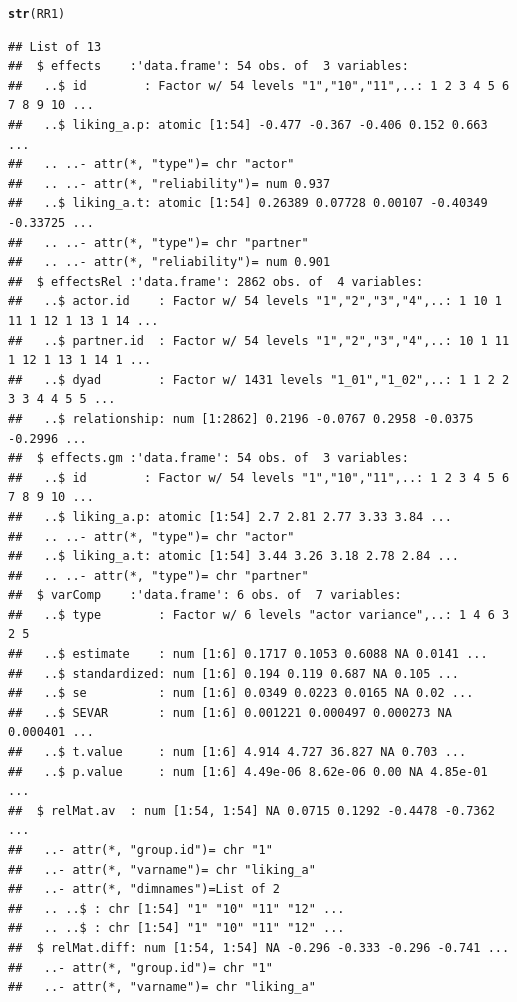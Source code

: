 \documentclass[a4paper]{article}\usepackage[]{graphicx}\usepackage[]{color}
\makeatletter
\newcommand{\hlstd}[1]{\textcolor[rgb]{0.345,0.345,0.345}{#1}}%
\newcommand{\hlkwd}[1]{\textcolor[rgb]{0.737,0.353,0.396}{\textbf{#1}}}%
\newenvironment{kframe}{%
 \def\at@end@of@kframe{}%
 \ifinner\ifhmode%
  \def\at@end@of@kframe{\end{minipage}}%
  \begin{minipage}{\columnwidth}%
 \fi\fi%
 \def\FrameCommand##1{\hskip\@totalleftmargin \hskip-\fboxsep
 \colorbox{shadecolor}{##1}\hskip-\fboxsep
     \hskip-\linewidth \hskip-\@totalleftmargin \hskip\columnwidth}%
 \MakeFramed {\advance\hsize-\width
   \@totalleftmargin\z@ \linewidth\hsize
   \@setminipage}}%
 {\par\unskip\endMakeFramed%
 \at@end@of@kframe}
\newenvironment{knitrout}{}{} %
\makeatother
\begin{document}
\begin{knitrout}\small
{}\color{fgcolor}\begin{kframe}
\begin{alltt}
\hlkwd{str}\hlstd{(RR1)}
\end{alltt}
\begin{verbatim}
## List of 13
##  $ effects    :'data.frame':	54 obs. of  3 variables:
##   ..$ id        : Factor w/ 54 levels "1","10","11",..: 1 2 3 4 5 6 7 8 9 10 ...
##   ..$ liking_a.p: atomic [1:54] -0.477 -0.367 -0.406 0.152 0.663 ...
##   .. ..- attr(*, "type")= chr "actor"
##   .. ..- attr(*, "reliability")= num 0.937
##   ..$ liking_a.t: atomic [1:54] 0.26389 0.07728 0.00107 -0.40349 -0.33725 ...
##   .. ..- attr(*, "type")= chr "partner"
##   .. ..- attr(*, "reliability")= num 0.901
##  $ effectsRel :'data.frame':	2862 obs. of  4 variables:
##   ..$ actor.id    : Factor w/ 54 levels "1","2","3","4",..: 1 10 1 11 1 12 1 13 1 14 ...
##   ..$ partner.id  : Factor w/ 54 levels "1","2","3","4",..: 10 1 11 1 12 1 13 1 14 1 ...
##   ..$ dyad        : Factor w/ 1431 levels "1_01","1_02",..: 1 1 2 2 3 3 4 4 5 5 ...
##   ..$ relationship: num [1:2862] 0.2196 -0.0767 0.2958 -0.0375 -0.2996 ...
##  $ effects.gm :'data.frame':	54 obs. of  3 variables:
##   ..$ id        : Factor w/ 54 levels "1","10","11",..: 1 2 3 4 5 6 7 8 9 10 ...
##   ..$ liking_a.p: atomic [1:54] 2.7 2.81 2.77 3.33 3.84 ...
##   .. ..- attr(*, "type")= chr "actor"
##   ..$ liking_a.t: atomic [1:54] 3.44 3.26 3.18 2.78 2.84 ...
##   .. ..- attr(*, "type")= chr "partner"
##  $ varComp    :'data.frame':	6 obs. of  7 variables:
##   ..$ type        : Factor w/ 6 levels "actor variance",..: 1 4 6 3 2 5
##   ..$ estimate    : num [1:6] 0.1717 0.1053 0.6088 NA 0.0141 ...
##   ..$ standardized: num [1:6] 0.194 0.119 0.687 NA 0.105 ...
##   ..$ se          : num [1:6] 0.0349 0.0223 0.0165 NA 0.02 ...
##   ..$ SEVAR       : num [1:6] 0.001221 0.000497 0.000273 NA 0.000401 ...
##   ..$ t.value     : num [1:6] 4.914 4.727 36.827 NA 0.703 ...
##   ..$ p.value     : num [1:6] 4.49e-06 8.62e-06 0.00 NA 4.85e-01 ...
##  $ relMat.av  : num [1:54, 1:54] NA 0.0715 0.1292 -0.4478 -0.7362 ...
##   ..- attr(*, "group.id")= chr "1"
##   ..- attr(*, "varname")= chr "liking_a"
##   ..- attr(*, "dimnames")=List of 2
##   .. ..$ : chr [1:54] "1" "10" "11" "12" ...
##   .. ..$ : chr [1:54] "1" "10" "11" "12" ...
##  $ relMat.diff: num [1:54, 1:54] NA -0.296 -0.333 -0.296 -0.741 ...
##   ..- attr(*, "group.id")= chr "1"
##   ..- attr(*, "varname")= chr "liking_a"

\end{verbatim}
\end{kframe}
\end{knitrout}
\end{document}
